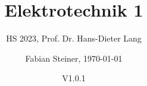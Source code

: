 \documentclass[fontsize=8pt, a4paper, fleqn, landscape, DIV=calc]{scrartcl}
\title{\vspace{-1cm}Elektrotechnik 1}
\subtitle{HS 2023, Prof. Dr. Hans-Dieter Lang}
\author{Fabian Steiner, \today}
\date{{\small V1.0.1}}
\begin{document}
	\begin{multicols*}{2}
        \begin{minipage}{0.75\columnwidth}
		      \maketitle
        \end{minipage}
        \begin{minipage}{0.2\columnwidth}
            \begin{center}
                \quad
                \qquad    
            \end{center}
        \end{minipage}
        
        \thispagestyle{fancy}%
        \raggedcolumns
        
        
        
        
        
        
	\end{multicols*}
 
\end{document}

